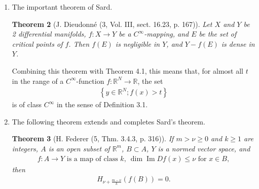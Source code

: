 \documentclass{book}
\numberwithin{equation}{section}
\newtheorem{theorem}{Theorem}[section]
\begin{document}
\begin{enumerate}
    \begin{theorem}
        Associate with a continuous function $f:\mathbb{R}^N\to\mathbb{R}$ the set \textbf{(4.6)}
        \begin{align*}
            \Omega := \left\{y\in\mathbb{R}^N;f(y) > 0\right\}.
        \end{align*}
        Assume that \textbf{(4.7)}
        \begin{align*}
            f^{-1}(0) := \left\{y\in\mathbb{R}^N;f(y) = 0\right\}\ne\emptyset,
        \end{align*}
        and that there exists a neighborhood $V$ of $f^{-1}(0)$ s.t. $f\in C^{k,l}(V)$ for some $k\ge 1$ and $0\le l\le 1$ and that $\nabla f\ne 0$ in $f^{-1}(0)$. Then $\Omega$ is a set of class $C^{k,l}$, \textbf{(4.8)}
        \begin{align*}
            {\rm int}\,\Omega = \Omega \mbox{ and } \partial\Omega = f^{-1}(0).
        \end{align*}
    \end{theorem}
    \item The important theorem of Sard.
    
    \begin{theorem}[J. Dieudonné (3, Vol. III, sect. 16.23, p. 167)]
        Let $X$ and $Y$ be 2 differential manifolds, $f:X\to Y$ be a $C^\infty$-mapping, and $E$ be the set of critical points of $f$. Then $f(E)$ is negligible in $Y$, and $Y - f(E)$ is dense in $Y$.
    \end{theorem}
    Combining this theorem with Theorem 4.1, this means that, for almost all $t$ in the range of a $C^\infty$-function $f:\mathbb{R}^N\to\mathbb{R}$, the set
    \begin{align*}
        \left\{y\in\mathbb{R}^N;f(x) > t\right\}
    \end{align*}
    is of class $C^\infty$ in the sense of Definition 3.1.
    \item The following theorem extends and completes Sard's theorem.
    
    \begin{theorem}[H. Federer (5, Thm. 3.4.3, p. 316)]
        If $m > \nu\ge 0$ and $k\ge 1$ are integers, $A$ is an open subset of $\mathbb{R}^m$, $B\subset A$, $Y$ is a normed vector space, and
        \begin{align*}
            f:A\to Y \mbox{ is a map of class } k,\ \dim\operatorname{Im}Df(x)\le\nu \mbox{ for } x\in B,
        \end{align*}
        then
        \begin{align*}
            H_{\nu + \frac{m - \nu}{k}}\left(f(B)\right) = 0.
        \end{align*}
    \end{theorem}
\end{enumerate}
\end{document}
